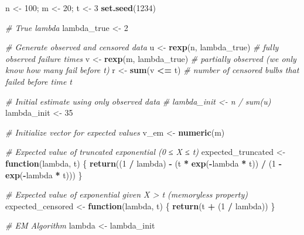 \documentclass[
]{article}
\newenvironment{Shaded}{\begin{snugshade}}{\end{snugshade}}
\newcommand{\CommentTok}[1]{\textcolor[rgb]{0.56,0.35,0.01}{\textit{#1}}}
\newcommand{\ControlFlowTok}[1]{\textcolor[rgb]{0.13,0.29,0.53}{\textbf{#1}}}
\newcommand{\DecValTok}[1]{\textcolor[rgb]{0.00,0.00,0.81}{#1}}
\newcommand{\FunctionTok}[1]{\textcolor[rgb]{0.13,0.29,0.53}{\textbf{#1}}}
\newcommand{\NormalTok}[1]{#1}
\newcommand{\OtherTok}[1]{\textcolor[rgb]{0.56,0.35,0.01}{#1}}
\newcommand{\SpecialCharTok}[1]{\textcolor[rgb]{0.81,0.36,0.00}{\textbf{#1}}}
\begin{document}
\begin{Shaded}
\begin{Highlighting}[]
\NormalTok{n }\OtherTok{\textless{}{-}} \DecValTok{100}\NormalTok{; m }\OtherTok{\textless{}{-}} \DecValTok{20}\NormalTok{; t }\OtherTok{\textless{}{-}} \DecValTok{3}
\FunctionTok{set.seed}\NormalTok{(}\DecValTok{1234}\NormalTok{)}

\CommentTok{\# True lambda}
\NormalTok{lambda\_true }\OtherTok{\textless{}{-}} \DecValTok{2}

\CommentTok{\# Generate observed and censored data}
\NormalTok{u }\OtherTok{\textless{}{-}} \FunctionTok{rexp}\NormalTok{(n, lambda\_true)         }\CommentTok{\# fully observed failure times}
\NormalTok{v }\OtherTok{\textless{}{-}} \FunctionTok{rexp}\NormalTok{(m, lambda\_true)         }\CommentTok{\# partially observed (we only know how many fail before t)}
\NormalTok{r }\OtherTok{\textless{}{-}} \FunctionTok{sum}\NormalTok{(v }\SpecialCharTok{\textless{}=}\NormalTok{ t)                  }\CommentTok{\# number of censored bulbs that failed before time t}

\CommentTok{\# Initial estimate using only observed data}
\CommentTok{\# lambda\_init \textless{}{-} n / sum(u)}
\NormalTok{lambda\_init }\OtherTok{\textless{}{-}} \DecValTok{35}

\CommentTok{\# Initialize vector for expected values}
\NormalTok{v\_em }\OtherTok{\textless{}{-}} \FunctionTok{numeric}\NormalTok{(m)}

\CommentTok{\# Expected value of truncated exponential (0 ≤ X ≤ t)}
\NormalTok{expected\_truncated }\OtherTok{\textless{}{-}} \ControlFlowTok{function}\NormalTok{(lambda, t) \{}
  \FunctionTok{return}\NormalTok{((}\DecValTok{1} \SpecialCharTok{/}\NormalTok{ lambda) }\SpecialCharTok{{-}}\NormalTok{ (t }\SpecialCharTok{*} \FunctionTok{exp}\NormalTok{(}\SpecialCharTok{{-}}\NormalTok{lambda }\SpecialCharTok{*}\NormalTok{ t)) }\SpecialCharTok{/}\NormalTok{ (}\DecValTok{1} \SpecialCharTok{{-}} \FunctionTok{exp}\NormalTok{(}\SpecialCharTok{{-}}\NormalTok{lambda }\SpecialCharTok{*}\NormalTok{ t)))}
\NormalTok{\}}

\CommentTok{\# Expected value of exponential given X \textgreater{} t (memoryless property)}
\NormalTok{expected\_censored }\OtherTok{\textless{}{-}} \ControlFlowTok{function}\NormalTok{(lambda, t) \{}
  \FunctionTok{return}\NormalTok{(t }\SpecialCharTok{+}\NormalTok{ (}\DecValTok{1} \SpecialCharTok{/}\NormalTok{ lambda))}
\NormalTok{\}}

\CommentTok{\# EM Algorithm}
\NormalTok{lambda }\OtherTok{\textless{}{-}}\NormalTok{ lambda\_init}


\end{Highlighting}
\end{Shaded}
\end{document}
